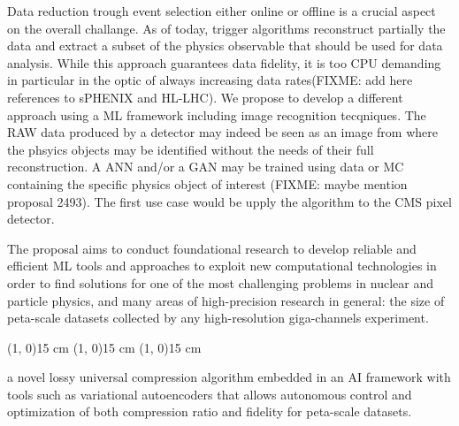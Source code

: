 Data reduction trough event selection either online or offline is a crucial aspect on the overall challange. As of today, trigger algorithms reconstruct partially the data and extract a subset of the physics observable that should be used for data analysis. While this approach guarantees data fidelity, it is too CPU demanding in particular in the optic of always increasing data rates(FIXME: add here references to sPHENIX and HL-LHC). We propose to develop a different approach using a ML framework including image recognition tecqniques. The RAW data produced by a detector may indeed be seen as an image from where the phsyics objects may be identified without the needs of their full reconstruction. A ANN and/or a GAN may be trained using data or MC containing the specific physics object of interest (FIXME: maybe mention proposal 2493). The first use case would be upply the algorithm to the CMS pixel detector.
 


 

The proposal aims to conduct foundational research to develop reliable and efficient ML tools and approaches to exploit new computational technologies in order to find solutions for one of the most challenging problems in nuclear and particle physics, and many areas of high-precision research in general: the size of peta-scale datasets collected by any high-resolution giga-channels experiment. 
\clearpage





\line(1, 0){15 cm}
\line(1, 0){15 cm}
\line(1, 0){15 cm}

a novel lossy universal compression algorithm embedded in an AI framework with tools such as variational autoencoders that allows autonomous control and optimization of both compression ratio and fidelity for peta-scale datasets.

